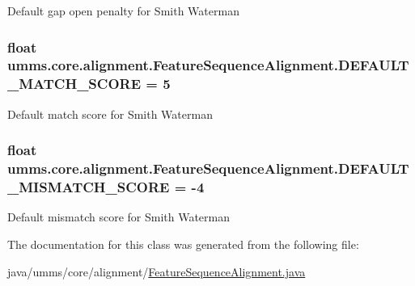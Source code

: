Default gap open penalty for Smith Waterman \hypertarget{classumms_1_1core_1_1alignment_1_1_feature_sequence_alignment_a632fe2de8b604500533be5ea8139473f}{
\subsubsection[{D\+E\+F\+A\+U\+L\+T\+\_\+\+M\+A\+T\+C\+H\+\_\+\+S\+C\+O\+R\+E}]{\setlength{\rightskip}{0pt plus 5cm}float umms.\+core.\+alignment.\+Feature\+Sequence\+Alignment.\+D\+E\+F\+A\+U\+L\+T\+\_\+\+M\+A\+T\+C\+H\+\_\+\+S\+C\+O\+R\+E = 5\hspace{0.3cm}{\ttfamily [static]}}}\label{classumms_1_1core_1_1alignment_1_1_feature_sequence_alignment_a632fe2de8b604500533be5ea8139473f}
Default match score for Smith Waterman \hypertarget{classumms_1_1core_1_1alignment_1_1_feature_sequence_alignment_a21bd1298e50fa041cd652da22e37770a}{
\subsubsection[{D\+E\+F\+A\+U\+L\+T\+\_\+\+M\+I\+S\+M\+A\+T\+C\+H\+\_\+\+S\+C\+O\+R\+E}]{\setlength{\rightskip}{0pt plus 5cm}float umms.\+core.\+alignment.\+Feature\+Sequence\+Alignment.\+D\+E\+F\+A\+U\+L\+T\+\_\+\+M\+I\+S\+M\+A\+T\+C\+H\+\_\+\+S\+C\+O\+R\+E = -\/4\hspace{0.3cm}{\ttfamily [static]}}}\label{classumms_1_1core_1_1alignment_1_1_feature_sequence_alignment_a21bd1298e50fa041cd652da22e37770a}
Default mismatch score for Smith Waterman 

The documentation for this class was generated from the following file\+:\begin{DoxyCompactItemize}
\item 
java/umms/core/alignment/\hyperlink{_feature_sequence_alignment_8java}{Feature\+Sequence\+Alignment.\+java}\end{DoxyCompactItemize}

